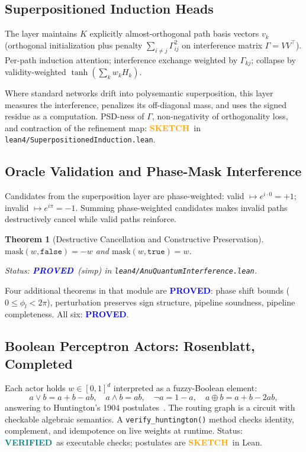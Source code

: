 \documentclass[11pt,letterpaper]{article}
\newtheorem{theorem}{Theorem}[section]
\newcommand{\PROVED}{\textbf{\textcolor{blue}{PROVED}}}
\newcommand{\VERIFIED}{\textbf{\textcolor{teal}{VERIFIED}}}
\newcommand{\SKETCH}{\textbf{\textcolor{orange}{SKETCH}}}
\begin{document}
\subsection{Superpositioned Induction Heads}

The layer maintains $K$ explicitly almost-orthogonal path basis vectors $v_k$
(orthogonal initialization plus penalty $\sum_{i \neq j} \Gamma_{ij}^2$ on
interference matrix $\Gamma = VV^\top$).  Per-path induction attention;
interference exchange weighted by $\Gamma_{kj}$; collapse by validity-weighted
$\tanh(\sum_k w_k H_k)$.

Where standard networks drift into polysemantic superposition, this layer
measures the interference, penalizes its off-diagonal mass, and uses the signed
residue as a computation.  PSD-ness of $\Gamma$, non-negativity of orthogonality
loss, and contraction of the refinement map: \SKETCH\ in
\texttt{lean4/SuperpositionedInduction.lean}.

\subsection{Oracle Validation and Phase-Mask Interference}

Candidates from the superposition layer are phase-weighted:
valid $\mapsto e^{i \cdot 0} = +1$; invalid $\mapsto e^{i\pi} = -1$.
Summing phase-weighted candidates makes invalid paths destructively cancel
while valid paths reinforce.

\begin{theorem}[Destructive Cancellation and Constructive Preservation]
$\mathrm{mask}(w, \mathtt{false}) = -w$ and $\mathrm{mask}(w, \mathtt{true}) = w$.

Status: \PROVED\ (simp) in \texttt{lean4/AnuQuantumInterference.lean}.
\end{theorem}

Four additional theorems in that module are \PROVED: phase shift bounds
($0 \leq \phi_l < 2\pi$), perturbation preserves sign structure,
pipeline soundness, pipeline completeness.  All six: \PROVED.

\subsection{Boolean Perceptron Actors: Rosenblatt, Completed}

Each actor holds $w \in [0,1]^d$ interpreted as a fuzzy-Boolean element:
\[
a \lor b = a + b - ab, \quad
a \land b = ab, \quad
\neg a = 1-a, \quad
a \oplus b = a + b - 2ab,
\]
answering to Huntington's 1904 postulates~\cite{huntington1904}.
The routing graph is a circuit with checkable algebraic semantics.
A \texttt{verify\_huntington()} method checks identity, complement, and
idempotence on live weights at runtime.
Status: \VERIFIED\ as executable checks; postulates are \SKETCH\ in Lean.
\end{document}
